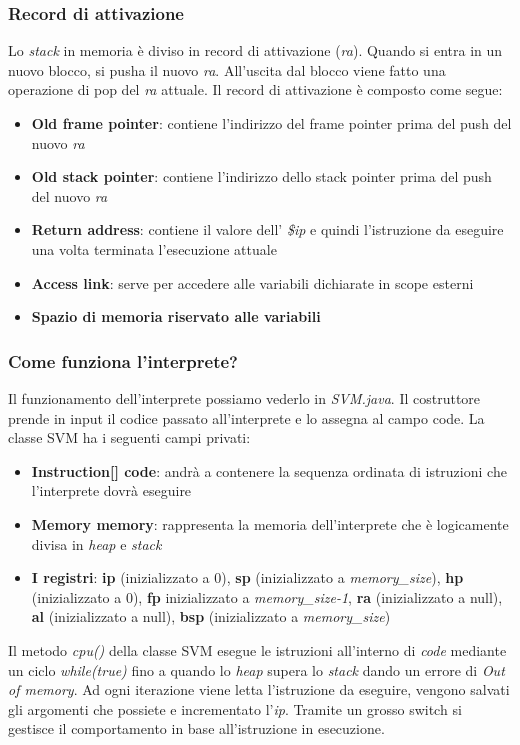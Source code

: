 \documentclass[../../main]{subfiles}
\begin{document}
\subsubsection{Record di attivazione}
Lo \emph{stack} in memoria è diviso in record di attivazione (\emph{ra}). Quando si entra in un nuovo blocco, si pusha il nuovo \emph{ra}. All'uscita dal blocco viene fatto una operazione di pop del \emph{ra} attuale.
Il record di attivazione è composto come segue: 
\begin{itemize}
    \item \textbf{Old frame pointer}: contiene l'indirizzo del frame pointer prima del push del nuovo \emph{ra}
    \item \textbf{Old stack pointer}: contiene l'indirizzo dello stack pointer prima del push del nuovo \emph{ra}
    \item \textbf{Return address}: contiene il valore dell' \emph{\$ip} e quindi l'istruzione da eseguire una volta terminata l'esecuzione attuale
    \item \textbf{Access link}: serve per accedere alle variabili dichiarate in scope esterni
    \item \textbf{Spazio di memoria riservato alle variabili}
\end{itemize}

\subsubsection{Come funziona l'interprete?}
Il funzionamento dell'interprete possiamo vederlo in \emph{SVM.java}. Il costruttore prende in input il codice passato all'interprete e lo assegna al campo code.
La classe SVM ha i seguenti campi privati:
\begin{itemize}
    \item \textbf{Instruction[] code}: andrà a contenere la sequenza ordinata di istruzioni che l'interprete dovrà eseguire
    \item \textbf{Memory memory}: rappresenta la memoria dell'interprete che è logicamente divisa in \emph{heap} e \emph{stack}
    \item \textbf{I registri}: \textbf{ip} (inizializzato a 0), \textbf{sp} (inizializzato a \emph{memory_size}), \textbf{hp} (inizializzato a 0), \textbf{fp} inizializzato a \emph{memory_size-1}, \textbf{ra} (inizializzato a null), \textbf{al} (inizializzato a null), \textbf{bsp} (inizializzato a \emph{memory_size}) 
\end{itemize}
Il metodo \emph{cpu()} della classe SVM esegue le istruzioni all'interno di \emph{code} mediante un ciclo \emph{while(true)} fino a quando lo \emph{heap} supera lo \emph{stack} dando un errore di \emph{Out of memory}.
Ad ogni iterazione viene letta l'istruzione da eseguire, vengono salvati gli argomenti che possiete e incrementato l'\emph{ip}. Tramite un grosso switch si gestisce il comportamento in base all'istruzione in esecuzione. 
\end{document}
